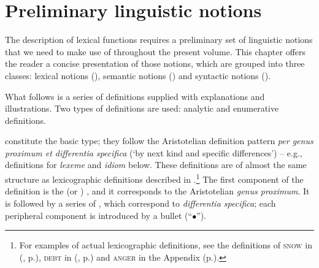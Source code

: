 
\chapter{Preliminary linguistic notions}\label{chap:preliminaryNotions}

The description of lexical functions requires a preliminary set of linguistic notions that we need to make use of throughout the present volume. This chapter offers the reader a concise presentation of those notions, which are grouped into three classes: lexical notions (), semantic notions () and syntactic notions ().

What follows is a series of definitions supplied with explanations and illustrations. Two types of definitions are used: analytic and enumerative definitions.

\label{txt:lexicographicDefinition} constitute the basic type; they follow the Aristotelian definition pattern \textit{per genus proximum et differentia specifica} (`by next kind and specific differences') -- e.g., definitions for \textit{lexeme} and \textit{idiom} below. These definitions are of almost the same structure as lexicographic definitions described in \textcite{MelcukPolguere2018}.\footnote{For examples of actual lexicographic definitions, see the definitions of \textsc{snow} in  (, p.\thinspace\pageref{ldef:defSNOW-n}), \textsc{debt} in  (, p.\thinspace\pageref{ldef:defDEBT}) and \textsc{anger} in the Appendix (p.\thinspace\pageref{def:ANGER-n}).} The first component of the definition is the  (or ) , and it corresponds to the Aristotelian \textit{genus proximum}. It is followed by a series of , which correspond to \textit{differentia specifica}; each peripheral component is introduced by a bullet (``{\footnotesize $\bullet$}'').

